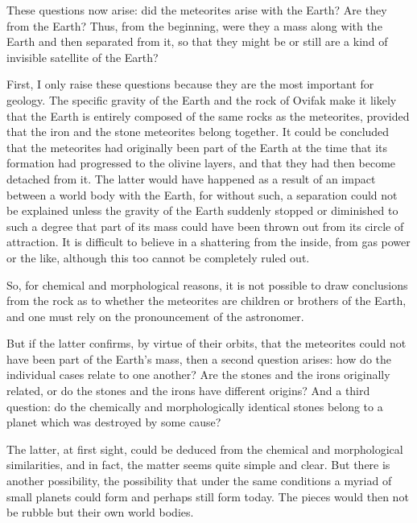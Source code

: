 \documentclass[a4paper, 12pt, oneside]{article}
\begin{document}
These questions now arise: did the meteorites arise with the Earth? Are they from the Earth? Thus, from the beginning, were they a mass along with the Earth and then separated from it, so that they might be or still are a kind of invisible satellite of the Earth?

First, I only raise these questions because they are the most important for geology. The specific gravity of the Earth and the rock of Ovifak make it likely that the Earth is entirely composed of the same rocks as the meteorites, provided that the iron and the stone meteorites belong together. It could be concluded that the meteorites had originally been part of the Earth at the time that its formation had progressed to the olivine layers, and that they had then become detached from it. The latter would have happened as a result of an impact between a world body with the Earth, for without such, a separation could not be explained unless the gravity of the Earth suddenly stopped or diminished to such a degree that part of its mass could have been thrown out from its circle of attraction. It is difficult to believe in a shattering from the inside, from gas power or the like, although this too cannot be completely ruled out.

So, for chemical and morphological reasons, it is not possible to draw conclusions from the rock as to whether the meteorites are children or brothers of the Earth, and one must rely on the pronouncement of the astronomer.

But if the latter confirms, by virtue of their orbits, that the meteorites could not have been part of the Earth's mass, then a second question arises: how do the individual cases relate to one another? Are the stones and the irons originally related, or do the stones and the irons have different origins? And a third question: do the chemically and morphologically identical stones belong to a planet which was destroyed by some cause?

The latter, at first sight, could be deduced from the chemical and morphological similarities, and in fact, the matter seems quite simple and clear. But there is another possibility, the possibility that under the same conditions a myriad of small planets could form and perhaps still form today. The pieces would then not be rubble but their own world bodies.
\end{document}

